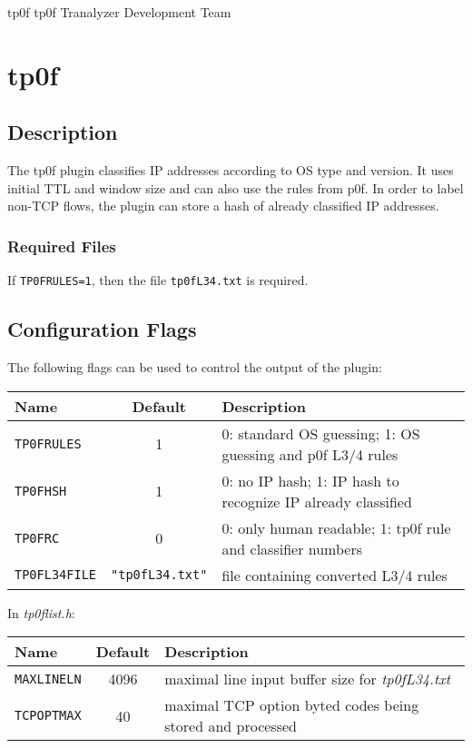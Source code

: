 \documentclass[documentation]{subfiles}
\begin{document}
\trantitle
    {tp0f} %
    {tp0f} %
    {Tranalyzer Development Team} %

\section{tp0f}\label{s:tp0f}

\subsection{Description}
The tp0f plugin classifies IP addresses according to OS type and version.
It uses initial TTL and window size and can also use the rules from p0f.
In order to label non-TCP flows, the plugin can store a hash of already classified IP addresses.

\subsubsection{Required Files}
If {\tt TP0FRULES=1}, then the file {\tt tp0fL34.txt} is required.

\subsection{Configuration Flags}
The following flags can be used to control the output of the plugin:

\begin{longtable}{lcl}
    \toprule
    {\bf Name} & {\bf Default} & {\bf Description} \\
    \midrule\endhead%
    {\tt TP0FRULES} & 1 & 0: standard OS guessing; 1: OS guessing and p0f L3/4 rules\\
    {\tt TP0FHSH}   & 1 & 0: no IP hash; 1: IP hash to recognize IP already classified\\
    {\tt TP0FRC}    & 0 & 0: only human readable; 1: tp0f rule and classifier numbers\\
    {\tt TP0FL34FILE} & {\tt\small "tp0fL34.txt"} & file containing converted L3/4 rules \\
    \bottomrule
\end{longtable}

In {\em tp0flist.h}:

\begin{longtable}{lcl}
    \toprule
    {\bf Name} & {\bf Default} & {\bf Description} \\
    \midrule\endhead%
    {\tt MAXLINELN} & 4096 & maximal line input buffer size for {\em tp0fL34.txt}\\
    {\tt TCPOPTMAX} &   40 & maximal TCP option byted codes being stored and processed\\
    \bottomrule
\end{longtable}
\end{document}
